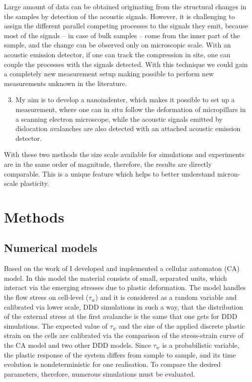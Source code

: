 \documentclass[a5paper,twoside,10pt]{article}
\begin{document}
Large amount of data can be obtained originating from the structural changes in the samples by detection of the acoustic signals. However, it is challenging to assign the different parallel competing processes to the signals they emit, because most of the signals -- in case of bulk samples -- come from the inner part of the sample, and the change can be observed only on microscopic scale. With an acoustic emission detector, if one can track the compression in site, one can couple the processes with the signals detected. With this technique we could gain a completely new measurement setup making possible to perform new measurements unknown in the literature. 

\begin{enumerate}
\setcounter{enumi}{2}
\item My aim is to develop a nanoindenter, which makes it possible to set up a measurement, where one can in situ follow the deformation of micropillars in a scanning electron microscope, while the acoustic signals emitted by dislocation avalanches are also detected with an attached acoustic emission detector.
\end{enumerate}

With these two methods the size scale available for simulations and experiments are in the same order of magnitude, therefore, the results are directly comparable. This is a unique feature which helps to better understand micron-scale plasticity.

\section*{Methods}
\subsection*{Numerical models}
Based on the work of \citet{1742-5468-2005-08-P08004} I developed and implemented a cellular automaton (CA) model. In this model the material consists of small, separated units, which interact via the emerging stresses due to plastic deformation. The model handles the flow stress on cell-level ($\tau_w$) and it is considered as a random variable and calibrated via lower scale, DDD simulations in such a way, that the distribution of the external stress at the first avalanche is the same that one gets for DDD simulations. The expected value of $\tau_w$ and the size of the applied discrete plastic strain on the cells are calibrated via the comparison of the stress-strain curve of the CA model and two other DDD models. Since $\tau_w$ is a probabilistic variable, the plastic response of the system differs from sample to sample, and its time evolution is nondeterministic for one realisation. To compare the desired parameters, therefore, numerous simulations must be evaluated.
\end{document}
